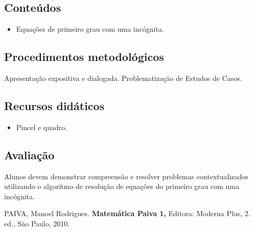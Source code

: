 \documentclass[oneside,a4paper,12pt]{article}
\begin{document}
\begin{snugshade}
	\section{Conteúdos} %
\end{snugshade}

\begin{itemize}

	\item Equações de primeiro grau com uma incógnita.

\end{itemize}

\begin{snugshade}
	\section{Procedimentos metodológicos} %
\end{snugshade}

Apresentação expositiva e dialogada. Problematização de Estudos de Casos.

\begin{snugshade}
	\section{Recursos didáticos} %
\end{snugshade}

\begin{itemize}

	\item Pincel e quadro.

\end{itemize}

\begin{snugshade}
	\section{Avaliação} %
\end{snugshade}

Alunos devem demonstrar compreensão e resolver problemas contextualizados utilizando o algoritmo de resolução de
equações do primeiro grau com uma incógnita.




\begin{thebibliography}{}

	PAIVA, Manoel Rodrigues.
	\newblock \textbf{Matemática Paiva 1,}
	\newblock Editora: Moderna Plus, 2. ed., São Paulo, 2010.

\end{thebibliography}
\end{document}
